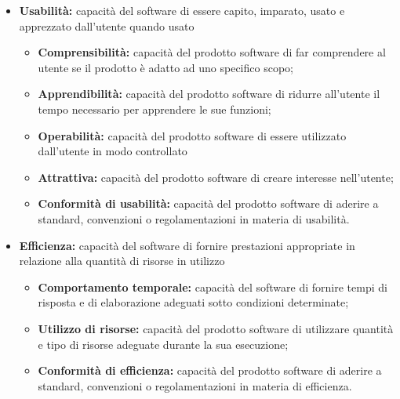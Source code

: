 \documentclass[a4paper]{report}
\begin{document}
\begin{itemize}
					\item \textbf{Usabilità:} capacità del software di essere capito, imparato, usato e apprezzato dall'utente
					quando usato
					\begin{itemize}
						\item \textbf{Comprensibilità:} capacità del prodotto software di far comprendere al utente se il
						prodotto è adatto ad uno specifico scopo;
						\item \textbf{Apprendibilità:} capacità del prodotto software di ridurre all'utente il tempo necessario
						per apprendere le sue funzioni;
						\item \textbf{Operabilità:} capacità del prodotto software di essere utilizzato dall'utente in modo
						controllato
						\item \textbf{Attrattiva:} capacità del prodotto software di creare interesse nell'utente;
						\item \textbf{Conformità di usabilità:} capacità del prodotto software di aderire a standard, convenzioni
						o regolamentazioni in materia di usabilità.
					\end{itemize}										
					
					\item \textbf{Efficienza:} capacità del software di fornire prestazioni appropriate in relazione alla quantità
					di risorse in utilizzo
					\begin{itemize}
						\item \textbf{Comportamento temporale:} capacità del software di fornire tempi di risposta e di
						elaborazione adeguati sotto condizioni determinate;
						\item \textbf{Utilizzo di risorse:} capacità del prodotto software di utilizzare quantità e tipo di
						risorse adeguate durante la sua esecuzione;
						\item \textbf{Conformità di efficienza:} capacità del prodotto software di aderire a standard,
						convenzioni o regolamentazioni in materia di efficienza.
					\end{itemize}										
					

\end{itemize}
\end{document}
